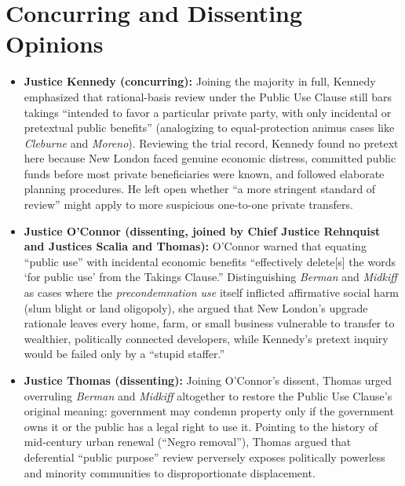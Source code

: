 \documentclass[12pt]{article}
\begin{document}
\section{Concurring and Dissenting Opinions}
\begin{itemize}
  \item \textbf{Justice Kennedy (concurring):} Joining the majority in full, Kennedy emphasized that rational-basis review under the Public Use Clause still bars takings ``intended to favor a particular private party, with only incidental or pretextual public benefits'' (analogizing to equal-protection animus cases like \textit{Cleburne} and \textit{Moreno}). Reviewing the trial record, Kennedy found no pretext here because New London faced genuine economic distress, committed public funds before most private beneficiaries were known, and followed elaborate planning procedures. He left open whether ``a more stringent standard of review'' might apply to more suspicious one-to-one private transfers.
  \item \textbf{Justice O'Connor (dissenting, joined by Chief Justice Rehnquist and Justices Scalia and Thomas):} O'Connor warned that equating ``public use'' with incidental economic benefits ``effectively delete[s] the words `for public use' from the Takings Clause.'' Distinguishing \textit{Berman} and \textit{Midkiff} as cases where the \textit{precondemnation use} itself inflicted affirmative social harm (slum blight or land oligopoly), she argued that New London's upgrade rationale leaves every home, farm, or small business vulnerable to transfer to wealthier, politically connected developers, while Kennedy's pretext inquiry would be failed only by a ``stupid staffer.''
  \item \textbf{Justice Thomas (dissenting):} Joining O'Connor's dissent, Thomas urged overruling \textit{Berman} and \textit{Midkiff} altogether to restore the Public Use Clause's original meaning: government may condemn property only if the government owns it or the public has a legal right to use it. Pointing to the history of mid-century urban renewal (``Negro removal''), Thomas argued that deferential ``public purpose'' review perversely exposes politically powerless and minority communities to disproportionate displacement.
\end{itemize}
\end{document}
